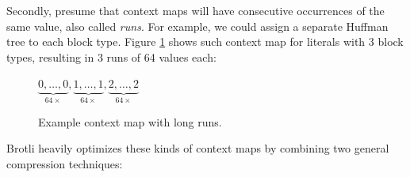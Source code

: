 \documentclass[english,master,dept460,male,cpp,cpdeclaration]{diploma}
\begin{document}
		Secondly, presume that context maps will have consecutive occurrences of the same value, also called \emph{runs}. For example, we could assign a separate Huffman tree to each block type. Figure \ref{fig:context-map-long-runs} shows such context map for literals with 3 block types, resulting in 3 runs of 64 values each:
		
		\begin{figure}[H]
			\centering
			$\underbrace{0,\dots,0}_{64 \times},\underbrace{1,\dots,1}_{64 \times},\underbrace{2,\dots,2}_{64 \times}$
			\caption{Example context map with long runs.}
			\label{fig:context-map-long-runs}
		\end{figure}
		
		\noindent
		Brotli heavily optimizes these kinds of context maps by combining two general compression techniques:
		
\end{document}
